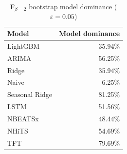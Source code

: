 \begin{table}
\caption{F$_{\beta=2}$ bootstrap model dominance ($\varepsilon=0.05$)}
\begin{tabular}{lr}
\toprule
Model & Model dominance \\
\midrule
LightGBM & 35.94\% \\
ARIMA & 56.25\% \\
Ridge & 35.94\% \\
Naive & 6.25\% \\
Seasonal Ridge & 81.25\% \\
LSTM & 51.56\% \\
NBEATSx & 48.44\% \\
NHiTS & 54.69\% \\
TFT & 79.69\% \\
\bottomrule
\end{tabular}
\end{table}
